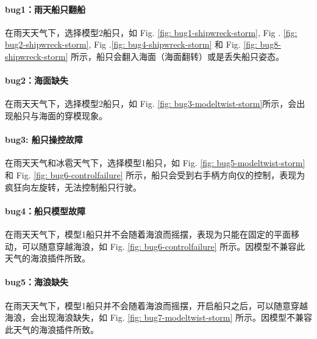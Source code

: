 \documentclass[a4paper,10pt]{article}
\begin{document}
		\paragraph{bug1：雨天船只翻船}
		
		在雨天天气下，选择模型2船只，如 Fig. \ref{fig: bug1-shipwreck-storm}, Fig . \ref{fig: bug2-shipwreck-storm}, Fig .\ref{fig: bug4-shipwreck-storm} 和 Fig. \ref{fig: bug8-shipwreck-storm} 所示，船只会翻入海面（海面翻转）或是丢失船只姿态。

		\paragraph{bug2：海面缺失}
		
		在雨天天气下，选择模型2船只，如 Fig. \ref{fig: bug3-modeltwist-storm}所示，会出现船只与海面的穿模现象。
		
		\paragraph{bug3: 船只操控故障}
		
		在雨天天气和冰雹天气下，选择模型1船只，如 Fig. \ref{fig: bug5-modeltwist-storm} 和 Fig. \ref{fig: bug6-controlfailure} 所示，船只会受到右手柄方向仪的控制，表现为疯狂向左旋转，无法控制船只行驶。
		
		\paragraph{bug4：船只模型故障}

		在雨天天气下，模型1船只并不会随着海浪而摇摆，表现为只能在固定的平面移动，可以随意穿越海浪，如 Fig. \ref{fig: bug6-controlfailure} 所示。因模型不兼容此天气的海浪插件所致。
		
		\paragraph{bug5：海浪缺失}
		
		在雨天天气下，模型1船只并不会随着海浪而摇摆，开启船只之后，可以随意穿越海浪，会出现海浪缺失，如 Fig. \ref{fig: bug7-modeltwist-storm} 所示。因模型不兼容此天气的海浪插件所致。
		
	
	
\end{document}
